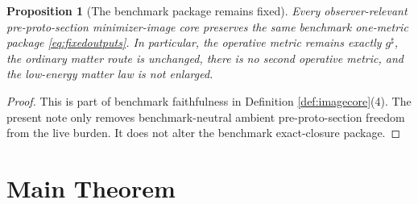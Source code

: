 \documentclass[11pt]{article}
\newcommand{\CompletedMetric}{g^{\sharp}}
\newtheorem{proposition}{Proposition}
\begin{document}
\begin{proposition}[The benchmark package remains fixed]
\label{prop:benchmark}
Every observer-relevant pre-proto-section minimizer-image core preserves the same benchmark one-metric package \eqref{eq:fixedoutputs}. In particular, the operative metric remains exactly \(\CompletedMetric\), the ordinary matter route is unchanged, there is no second operative metric, and the low-energy matter law is not enlarged.
\end{proposition}

\begin{proof}
This is part of benchmark faithfulness in Definition \ref{def:imagecore}(4). The present note only removes benchmark-neutral ambient pre-proto-section freedom from the live burden. It does not alter the benchmark exact-closure package.
\end{proof}

\section{Main Theorem}
\end{document}
